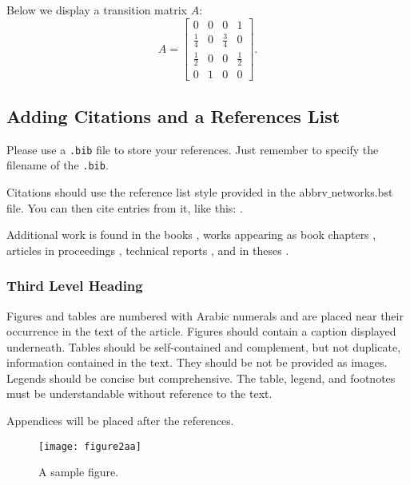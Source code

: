 Below we display a transition matrix $A$:
\[
      A = \begin{bmatrix}
            0           & 0 & 0           & 1           \\
            \frac{1}{4} & 0 & \frac{3}{4} & 0           \\[.06cm]
            \frac{1}{2} & 0 & 0           & \frac{1}{2} \\[.05cm]
            0           & 1 & 0           & 0
      \end{bmatrix}.
\]




\subsection{Adding Citations and a References List}

Please use a \verb|.bib| file to store your references. Just remember to specify the filename of the \verb|.bib|.

Citations should use the reference list style provided in the  abbrv$\_$networks.bst file. You can then cite entries from it, like this: \cite{Adams}.


Additional work is found in the books \cite{AhujaEtal, vonNeumann}, works appearing as book chapters \cite{ReadTutte, Shapiro}, articles in proceedings \cite{Goemans, Seibert}, technical reports \cite{Jones}, and in theses \cite{Ponza, Wilson}.





\subsubsection{Third Level Heading}
Figures and tables are numbered with Arabic numerals and are placed near their occurrence in the text of the article.
Figures should contain a caption displayed underneath.
Tables should be self-contained and complement, but not duplicate, information contained in the text. They should be not be provided as images. Legends should be concise but comprehensive. The table, legend, and footnotes must be understandable without reference to the text.

Appendices will be placed after the references.

\begin{figure}[h!]
      \centering
      \texttt{[image: figure2aa]}
      \caption{A sample figure.}
\end{figure}

